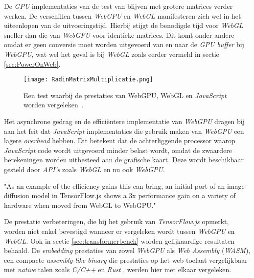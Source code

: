 \bigbreak{}

De \textit{GPU} implementaties van de test van \textcite{Radin2021} blijven met grotere matrices verder werken. De verschillen tussen \textit{WebGPU} en \textit{WebGL} manifesteren zich wel in het uiteenlopen van de uitvoeringstijd. Hierbij stijgt de benodigde tijd voor \textit{WebGL} sneller dan die van \textit{WebGPU} voor identieke matrices. Dit komt onder andere omdat er geen conversie moet worden uitgevoerd van en naar de \textit{GPU buffer} bij \textit{WebGPU}, wat wel het geval is bij \textit{WebGL} zoals eerder vermeld in sectie \ref{sec:PowerOnWeb}. 

\break{}

\begin{figure}
    \texttt{[image: RadinMatrixMultiplicatie.png]}
    \caption[Matrixvermenigvuldiging test~\autocite{Radin2021}]{Een test waarbij de prestaties van WebGPU, WebGL en \textit{JavaScript} worden vergeleken~\autocite{Radin2021}.}
    \label{fig:Matrix Multiplication By Radin}
\end{figure}

Het asynchrone gedrag en de efficiëntere implementatie van \textit{WebGPU} dragen bij aan het feit dat \textit{JavaScript} implementaties die gebruik maken van \textit{WebGPU} een lagere \textit{overhead} hebben. Dit betekent dat de achterliggende processor waarop \textit{JavaScript} code wordt uitgevoerd minder  belast wordt, omdat de zwaardere berekeningen worden uitbesteed aan de grafische kaart. Deze wordt beschikbaar gesteld door \textit{API's} zoals \textit{WebGL} en nu ook \textit{WebGPU}.

\begin{displayquote}
    "As an example of the efficiency gains this can bring, an initial port of an image diffusion model in TensorFlow.js shows a 3x performance gain on a variety of hardware when moved from WebGL to WebGPU."
\end{displayquote}

De prestatie verbeteringen, die \textcite{Wallez2023} bij het gebruik van \textit{TensorFlow.js} opmerkt, worden niet enkel bevestigd wanneer er vergeleken wordt tussen \textit{WebGPU} en \textit{WebGL}. Ook in sectie \ref{sec:transformerbench} worden gelijkaardige resultaten behaald. De \textit{embedding} prestaties van zowel \textit{WebGPU} als \textit{Web Assembly} (\textit{WASM}), een compacte \textit{assembly-like binary} die prestaties op het web toelaat vergelijkbaar met \textit{native} talen zoals \textit{C/C++} en \textit{Rust} \autocite{Steiner2023}, werden hier met elkaar vergeleken.

